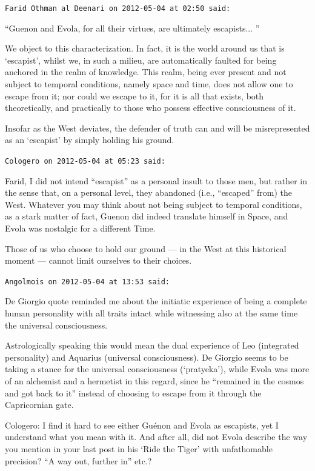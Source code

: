 \begin{footnotesize}
\begin{sffamily}
\texttt{Farid Othman al Deenari on 2012-05-04 at 02:50 said:}

``Guenon and Evola, for all their virtues, are ultimately escapists... ''

We object to this characterization. In fact, it is the world around us that is `escapist', whilst we, in such a milieu, are automatically faulted for being anchored in the realm of knowledge. This realm, being ever present and not subject to temporal conditions, namely space and time, does not allow one to escape from it; nor could we escape to it, for it is all that exists, both theoretically, and practically to those who possess effective consciousness of it.

Insofar as the West deviates, the defender of truth can and will be misrepresented as an `escapist' by simply holding his ground.

\hfill

\texttt{Cologero on 2012-05-04 at 05:23 said:}

Farid, I did not intend ``escapist'' as a personal insult to those men, but rather in the sense that, on a personal level, they abandoned (i.e., ``escaped'' from) the West. Whatever you may think about not being subject to temporal conditions, as a stark matter of fact, Guenon did indeed translate himself in Space, and Evola was nostalgic for a different Time.

Those of us who choose to hold our ground --- in the West at this historical moment --- cannot limit ourselves to their choices.

\hfill

\texttt{Angolmois on 2012-05-04 at 13:53 said:}

De Giorgio quote reminded me about the initiatic experience of being a complete human personality with all traits intact while witnessing also at the same time the universal consciousness.

Astrologically speaking this would mean the dual experience of Leo (integrated personality) and Aquarius (universal consciousness). De Giorgio seems to be taking a stance for the universal consciousness (`pratyeka'), while Evola was more of an alchemist and a hermetist in this regard, since he ``remained in the cosmos and got back to it'' instead of choosing to escape from it through the Capricornian gate.

Cologero: I find it hard to see either Guénon and Evola as escapists, yet I understand what you mean with it. And after all, did not Evola describe the way you mention in your last post in his `Ride the Tiger' with unfathomable precision? ``A way out, further in'' etc.?


\end{sffamily}
\end{footnotesize}

